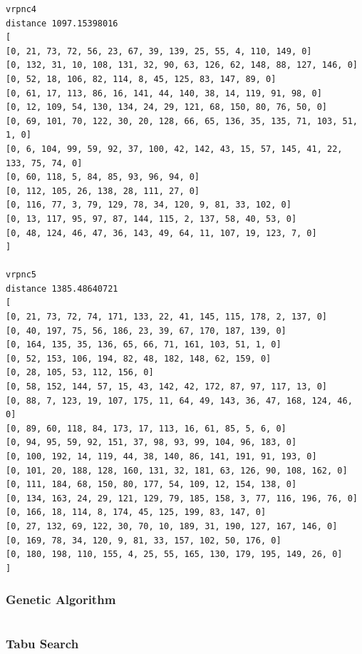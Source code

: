 \documentclass{article} %
\begin{document}
\begin{lstlisting}[breaklines, basicstyle=\tiny]
vrpnc4
distance 1097.15398016
[
[0, 21, 73, 72, 56, 23, 67, 39, 139, 25, 55, 4, 110, 149, 0]
[0, 132, 31, 10, 108, 131, 32, 90, 63, 126, 62, 148, 88, 127, 146, 0]
[0, 52, 18, 106, 82, 114, 8, 45, 125, 83, 147, 89, 0]
[0, 61, 17, 113, 86, 16, 141, 44, 140, 38, 14, 119, 91, 98, 0]
[0, 12, 109, 54, 130, 134, 24, 29, 121, 68, 150, 80, 76, 50, 0]
[0, 69, 101, 70, 122, 30, 20, 128, 66, 65, 136, 35, 135, 71, 103, 51, 1, 0]
[0, 6, 104, 99, 59, 92, 37, 100, 42, 142, 43, 15, 57, 145, 41, 22, 133, 75, 74, 0]
[0, 60, 118, 5, 84, 85, 93, 96, 94, 0]
[0, 112, 105, 26, 138, 28, 111, 27, 0]
[0, 116, 77, 3, 79, 129, 78, 34, 120, 9, 81, 33, 102, 0]
[0, 13, 117, 95, 97, 87, 144, 115, 2, 137, 58, 40, 53, 0]
[0, 48, 124, 46, 47, 36, 143, 49, 64, 11, 107, 19, 123, 7, 0]
]

vrpnc5
distance 1385.48640721
[
[0, 21, 73, 72, 74, 171, 133, 22, 41, 145, 115, 178, 2, 137, 0]
[0, 40, 197, 75, 56, 186, 23, 39, 67, 170, 187, 139, 0]
[0, 164, 135, 35, 136, 65, 66, 71, 161, 103, 51, 1, 0]
[0, 52, 153, 106, 194, 82, 48, 182, 148, 62, 159, 0]
[0, 28, 105, 53, 112, 156, 0]
[0, 58, 152, 144, 57, 15, 43, 142, 42, 172, 87, 97, 117, 13, 0]
[0, 88, 7, 123, 19, 107, 175, 11, 64, 49, 143, 36, 47, 168, 124, 46, 0]
[0, 89, 60, 118, 84, 173, 17, 113, 16, 61, 85, 5, 6, 0]
[0, 94, 95, 59, 92, 151, 37, 98, 93, 99, 104, 96, 183, 0]
[0, 100, 192, 14, 119, 44, 38, 140, 86, 141, 191, 91, 193, 0]
[0, 101, 20, 188, 128, 160, 131, 32, 181, 63, 126, 90, 108, 162, 0]
[0, 111, 184, 68, 150, 80, 177, 54, 109, 12, 154, 138, 0]
[0, 134, 163, 24, 29, 121, 129, 79, 185, 158, 3, 77, 116, 196, 76, 0]
[0, 166, 18, 114, 8, 174, 45, 125, 199, 83, 147, 0]
[0, 27, 132, 69, 122, 30, 70, 10, 189, 31, 190, 127, 167, 146, 0]
[0, 169, 78, 34, 120, 9, 81, 33, 157, 102, 50, 176, 0]
[0, 180, 198, 110, 155, 4, 25, 55, 165, 130, 179, 195, 149, 26, 0]
]

\end{lstlisting}



\subsubsection{Genetic Algorithm}
\begin{lstlisting}[breaklines, basicstyle=\tiny]

\end{lstlisting}


\subsubsection{Tabu Search}
\begin{lstlisting}[breaklines, basicstyle=\tiny]

\end{lstlisting}
\end{document}
